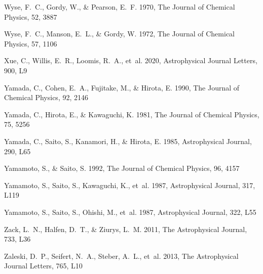 \documentclass[twocolumn]{aastex631}
\begin{document}
\begin{thebibliography}{}
Wyse, F.~C., Gordy, W., \& Pearson, E.~F. 1970, The Journal of Chemical
  Physics, 52, 3887

Wyse, F.~C., Manson, E.~L., \& Gordy, W. 1972, The Journal of Chemical Physics,
  57, 1106

Xue, C., Willis, E.~R., Loomis, R.~A., {et~al.} 2020, Astrophysical Journal
  Letters, 900, L9

Yamada, C., Cohen, E.~A., Fujitake, M., \& Hirota, E. 1990, The Journal of
  Chemical Physics, 92, 2146

Yamada, C., Hirota, E., \& Kawaguchi, K. 1981, The Journal of Chemical Physics,
  75, 5256

Yamada, C., Saito, S., Kanamori, H., \& Hirota, E. 1985, Astrophysical Journal,
  290, L65

Yamamoto, S., \& Saito, S. 1992, The Journal of Chemical Physics, 96, 4157

Yamamoto, S., Saito, S., Kawaguchi, K., {et~al.} 1987{},
  Astrophysical Journal, 317, L119

Yamamoto, S., Saito, S., Ohishi, M., {et~al.} 1987{}, Astrophysical
  Journal, 322, L55

Zack, L.~N., Halfen, D.~T., \& Ziurys, L.~M. 2011, The Astrophysical Journal,
  733, L36

Zaleski, D.~P., Seifert, N.~A., Steber, A.~L., {et~al.} 2013, The Astrophysical
  Journal Letters, 765, L10


\end{thebibliography}
\end{document}
